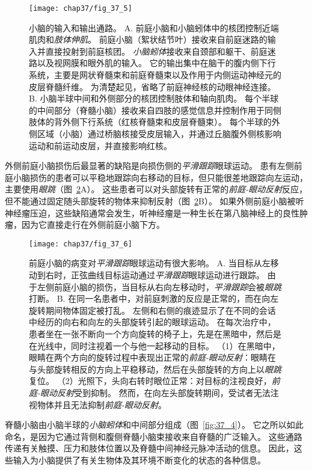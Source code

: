 \begin{figure}[htbp]
	\centering
	\texttt{[image: chap37/fig\_37\_5]}
	\caption{小脑的输入和输出通路。
		A. 前庭小脑和小脑蚓体中的核团控制近端肌肉和\textit{肢体伸肌}。
		前庭小脑（絮状结节叶）接收来自前庭迷路的输入并直接投射到前庭核团。
		\textit{小脑蚓体}接收来自颈部和躯干、前庭迷路以及视网膜和眼外肌的输入。
		它的输出集中在脑干的腹内侧下行系统，主要是网状脊髓束和前庭脊髓束以及作用于内侧运动神经元的皮层脊髓纤维。
		为清楚起见，省略了前庭神经核的动眼神经连接。
		B. 小脑半球中间和外侧部分的核团控制肢体和轴向肌肉。
		每个半球的中间部分（脊髓小脑）接收来自四肢的感觉信息并控制作用于同侧肢体的背外侧下行系统（红核脊髓束和皮层脊髓束）。
		每个半球的外侧区域（小脑）通过桥脑核接受皮层输入，并通过丘脑腹外侧核影响运动和前运动皮层，并直接影响红核。}
	\label{fig:37_5}
\end{figure}


外侧前庭小脑损伤后最显著的缺陷是向损伤侧的\textit{平滑跟踪}眼球运动。
患有左侧前庭小脑损伤的患者可以平稳地跟踪向右移动的目标，但只能很差地跟踪向左运动，主要使用\textit{眼跳}（图~\ref{fig:37_6}A）。
这些患者可以对头部旋转有正常的\textit{前庭-眼动反射}反应，但不能通过固定随头部旋转的物体来抑制反射（图~\ref{fig:37_6}B）。
如果外侧前庭小脑被听神经瘤压迫，这些缺陷通常会发生，听神经瘤是一种生长在第八脑神经上的良性肿瘤，因为它直接走行在外侧前庭小脑下方。


\begin{figure}[htbp]
	\centering
	\texttt{[image: chap37/fig\_37\_6]}
	\caption{前庭小脑的病变对\textit{平滑跟踪}眼球运动有很大影响。
		A. 当目标从左移动到右时，正弦曲线目标运动通过\textit{平滑跟踪}眼球运动进行跟踪。
		由于左侧前庭小脑的损伤，当目标从右向左移动时，\textit{平滑跟踪}会被\textit{眼跳}打断。
		B. 在同一名患者中，对前庭刺激的反应是正常的，而在向左旋转期间物体固定被打乱。
		左侧和右侧的痕迹显示了在不同的会话中经历的向右和向左的头部旋转引起的眼球运动。
		在每次治疗中，患者坐在一张不断向一个方向旋转的椅子上，先是在黑暗中，然后是在光线中，同时注视着一个与他一起移动的目标。
		（1）在黑暗中，眼睛在两个方向的旋转过程中表现出正常的\textit{前庭-眼动反射}：眼睛在与头部旋转相反的方向上平稳移动，然后在头部旋转的方向上以\textit{眼跳}复位。
		（2）光照下，头向右转时眼位正常：对目标的注视良好，\textit{前庭-眼动反射}受到抑制。
		然而，在向左头部旋转期间，受试者无法注视物体并且无法抑制\textit{前庭-眼动反射}。}
	\label{fig:37_6}
\end{figure}


脊髓小脑由小脑半球的\textit{小脑蚓体}和中间部分组成（图~\ref{fig:37_4}）。
它之所以如此命名，是因为它通过背侧和腹侧脊髓小脑束接收来自脊髓的广泛输入。
这些通路传递有关触摸、压力和肢体位置以及脊髓中间神经元脉冲活动的信息。
因此，这些输入为小脑提供了有关生物体及其环境不断变化的状态的各种信息。



